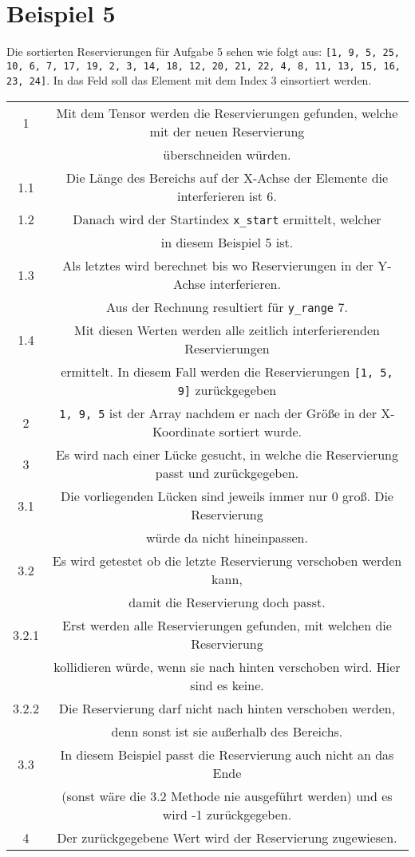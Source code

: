 \section{Beispiel 5}
Die sortierten Reservierungen für Aufgabe 5 sehen wie folgt aus: \texttt{[1, 9, 5, 25, 10, 6, 7, 17, 19, 2, 3, 14, 18, 12, 20, 21, 22, 4, 8, 11, 13, 15, 16, 23, 24]}. In das Feld soll das Element mit dem Index 3 einsortiert werden.

\begin{table}[H]
    \centering
    \begin{tabular}{|c|c|}
        \hline
        1 & Mit dem Tensor werden die Reservierungen gefunden, welche mit der neuen Reservierung \\& überschneiden würden.\\ \hline
        1.1 & Die Länge des Bereichs auf der X-Achse der Elemente die interferieren ist 6.\\ \hline
        1.2 & Danach wird der Startindex \texttt{x\_start} ermittelt, welcher \\& in diesem Beispiel 5 ist. \\ \hline
        1.3 & Als letztes wird berechnet bis wo Reservierungen in der Y-Achse interferieren. \\&Aus der Rechnung resultiert für \texttt{y\_range} 7. \\ \hline
        1.4 & Mit diesen Werten werden alle zeitlich interferierenden Reservierungen \\& ermittelt. In diesem Fall werden die Reservierungen \texttt{[1, 5, 9]} zurückgegeben \\ \hline
        2 & \texttt{1, 9, 5} ist der Array nachdem er nach der Größe in der X-Koordinate sortiert wurde.\\ \hline
        3 & Es wird nach einer Lücke gesucht, in welche die Reservierung passt und zurückgegeben. \\ \hline
        3.1 & Die vorliegenden Lücken sind jeweils immer nur 0 groß. Die Reservierung \\& würde da nicht hineinpassen. \\ \hline
        3.2 & Es wird getestet ob die letzte Reservierung verschoben werden kann, \\& damit die Reservierung doch passt. \\ \hline
        3.2.1 & Erst werden alle Reservierungen gefunden, mit welchen die Reservierung \\& kollidieren würde, wenn sie nach hinten verschoben wird. Hier sind es keine.\\ \hline
        3.2.2 & Die Reservierung darf nicht nach hinten verschoben werden,\\& denn sonst ist sie außerhalb des Bereichs. \\ \hline
        3.3 & In diesem Beispiel passt die Reservierung auch nicht an das Ende \\&(sonst wäre die 3.2 Methode nie ausgeführt werden) und es wird -1 zurückgegeben.\\ \hline
        4 & Der zurückgegebene Wert wird der Reservierung zugewiesen. \\ \hline
    \end{tabular}
\end{table}
